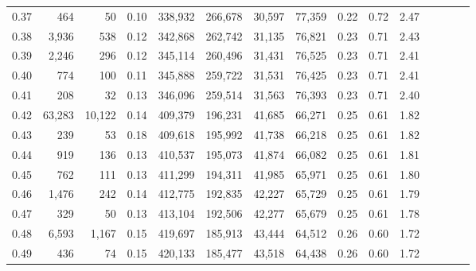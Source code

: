 \begin{tabular}{rrrcrrrrrrrrrrr}
0.37 &     464 &      50 &                                       0.10 &  338,932 &  266,678 &   30,597 &   77,359 &  0.22 &  0.72 &                         2.47 \\
0.38 &   3,936 &     538 &                                       0.12 &  342,868 &  262,742 &   31,135 &   76,821 &  0.23 &  0.71 &                         2.43 \\
0.39 &   2,246 &     296 &                                       0.12 &  345,114 &  260,496 &   31,431 &   76,525 &  0.23 &  0.71 &                         2.41 \\
0.40 &     774 &     100 &                                       0.11 &  345,888 &  259,722 &   31,531 &   76,425 &  0.23 &  0.71 &                         2.41 \\
0.41 &     208 &      32 &                                       0.13 &  346,096 &  259,514 &   31,563 &   76,393 &  0.23 &  0.71 &                         2.40 \\
0.42 &  63,283 &  10,122 &                                       0.14 &  409,379 &  196,231 &   41,685 &   66,271 &  0.25 &  0.61 &                         1.82 \\
0.43 &     239 &      53 &                                       0.18 &  409,618 &  195,992 &   41,738 &   66,218 &  0.25 &  0.61 &                         1.82 \\
0.44 &     919 &     136 &                                       0.13 &  410,537 &  195,073 &   41,874 &   66,082 &  0.25 &  0.61 &                         1.81 \\
0.45 &     762 &     111 &                                       0.13 &  411,299 &  194,311 &   41,985 &   65,971 &  0.25 &  0.61 &                         1.80 \\
0.46 &   1,476 &     242 &                                       0.14 &  412,775 &  192,835 &   42,227 &   65,729 &  0.25 &  0.61 &                         1.79 \\
0.47 &     329 &      50 &                                       0.13 &  413,104 &  192,506 &   42,277 &   65,679 &  0.25 &  0.61 &                         1.78 \\
0.48 &   6,593 &   1,167 &                                       0.15 &  419,697 &  185,913 &   43,444 &   64,512 &  0.26 &  0.60 &                         1.72 \\
0.49 &     436 &      74 &                                       0.15 &  420,133 &  185,477 &   43,518 &   64,438 &  0.26 &  0.60 &                         1.72 \\

\end{tabular}
